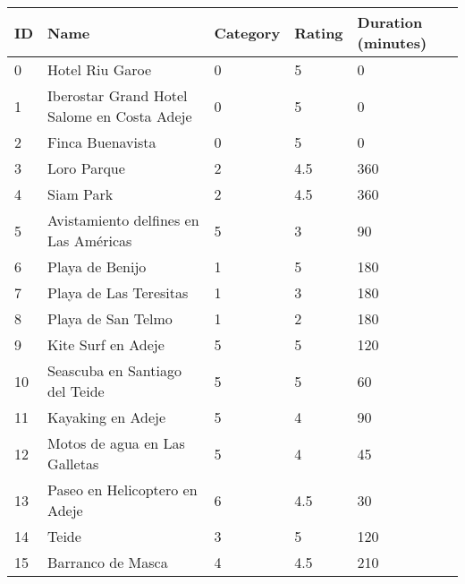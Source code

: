 \documentclass[preprint,14pt]{elsarticle}
\begin{document}
\begin{table}[H]
\centering
\begin{tabular}{@{}|l|l|l|l|l|@{}}
\toprule
ID & Name                                        & Category & Rating & Duration (minutes) \\ \midrule
0  & Hotel Riu Garoe                             & 0        & 5    & 0                  \\ \midrule
1  & Iberostar Grand Hotel Salome en Costa Adeje & 0        & 5    & 0                  \\ \midrule
2  & Finca Buenavista                            & 0        & 5    & 0                  \\ \midrule
3  & Loro Parque                                 & 2        & 4.5  & 360                \\ \midrule
4  & Siam Park                                   & 2        & 4.5  & 360                \\ \midrule
5  & Avistamiento delfines en Las Américas       & 5        & 3    & 90                 \\ \midrule
6  & Playa de Benijo                             & 1        & 5    & 180                \\ \midrule
7  & Playa de Las Teresitas                      & 1        & 3    & 180                \\ \midrule
8  & Playa de San Telmo                          & 1        & 2    & 180                \\ \midrule
9  & Kite Surf en Adeje                          & 5        & 5    & 120                \\ \midrule
10 & Seascuba en Santiago del Teide              & 5        & 5    & 60                 \\ \midrule
11 & Kayaking en Adeje                           & 5        & 4    & 90                 \\ \midrule
12 & Motos de agua en Las Galletas               & 5        & 4    & 45                 \\ \midrule
13 & Paseo en Helicoptero en Adeje               & 6        & 4.5  & 30                 \\ \midrule
14 & Teide                                       & 3        & 5    & 120                \\ \midrule
15 & Barranco de Masca                           & 4        & 4.5  & 210                \\ \midrule

\end{tabular}
\end{table}
\end{document}
